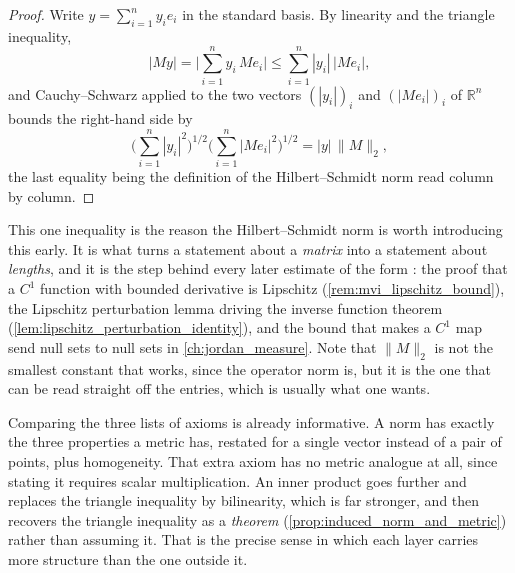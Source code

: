 \begin{proof}
Write $y = \sum_{i=1}^n y_ie_i$ in the standard basis. By linearity and the triangle inequality,
\[|My| = \Big|\sum_{i=1}^n y_i\,Me_i\Big| \leq \sum_{i=1}^n |y_i|\,|Me_i|,\]
and Cauchy--Schwarz applied to the two vectors $(|y_i|)_i$ and $(|Me_i|)_i$ of $\mathbb{R}^n$
bounds the right-hand side by
\[\Big(\sum_{i=1}^n |y_i|^2\Big)^{1/2}\Big(\sum_{i=1}^n |Me_i|^2\Big)^{1/2} = |y|\,\|M\|_2,\]
the last equality being the definition of the Hilbert--Schmidt norm read column by column.
\end{proof}

\begin{remark}
\label{rem:why_hilbert_schmidt}
This one inequality is the reason the Hilbert--Schmidt norm is worth introducing this early. It
is what turns a statement about a \emph{matrix} into a statement about \emph{lengths}, and it is
the step behind every later estimate of the form : the
proof that a $C^1$ function with bounded derivative is Lipschitz
(\cref{rem:mvi_lipschitz_bound}), the Lipschitz perturbation lemma driving the inverse function
theorem (\cref{lem:lipschitz_perturbation_identity}), and the bound that makes a $C^1$ map send
null sets to null sets in \cref{ch:jordan_measure}. Note that $\|M\|_2$ is not the smallest
constant that works, since the operator norm is, but it is the one that can be read straight off
the entries, which is usually what one wants.
\end{remark}

Comparing the three lists of axioms is already informative. A norm has exactly the three
properties a metric has, restated for a single vector instead of a pair of points, plus
homogeneity. That extra axiom has no metric analogue at all, since stating it requires scalar
multiplication. An inner product goes further and replaces the triangle inequality by
bilinearity, which is far stronger, and then recovers the triangle inequality as a \emph{theorem}
(\cref{prop:induced_norm_and_metric}) rather than assuming it. That is the precise sense in which
each layer carries more structure than the one outside it.



